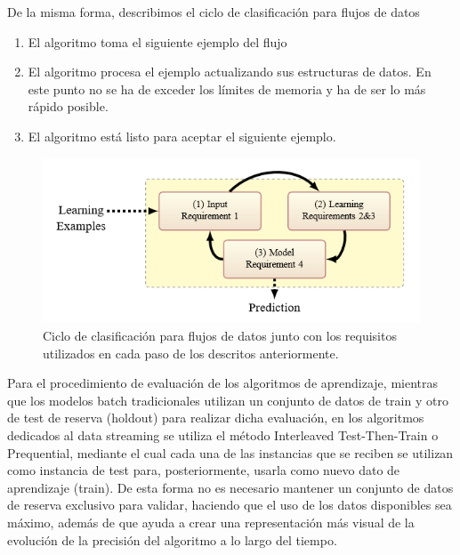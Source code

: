 De la misma forma, describimos el ciclo de clasificación para flujos de datos
\begin{enumerate}
	\item El algoritmo toma el siguiente ejemplo del flujo
	\item El algoritmo procesa el ejemplo actualizando sus estructuras de datos. En este punto no se ha de exceder los límites de memoria y ha de ser lo más rápido posible.
	\item El algoritmo está listo para aceptar el siguiente ejemplo.
\end{enumerate}

\begin{figure}[H]
	\centering
	\includegraphics[width=1\textwidth]{imagenes/ccfd} 
	\caption{Ciclo de clasificación para flujos de datos junto con los requisitos utilizados en cada paso de los descritos anteriormente.}
\end{figure}

Para el procedimiento de evaluación de los algoritmos de aprendizaje, mientras que los modelos batch tradicionales utilizan un conjunto de datos de train y otro de 
test de reserva (holdout) para realizar dicha evaluación, en los algoritmos dedicados al data streaming se utiliza el método  Interleaved Test-Then-Train o Prequential,
mediante el cual cada una de las instancias que se reciben se utilizan como instancia de test para, posteriormente, usarla como nuevo dato de aprendizaje (train).
De esta forma no es necesario mantener un conjunto de datos de reserva exclusivo para validar, haciendo que el uso de los datos disponibles sea máximo, además
de que ayuda a crear una representación más visual de la evolución de la precisión del algoritmo a lo largo del tiempo.














